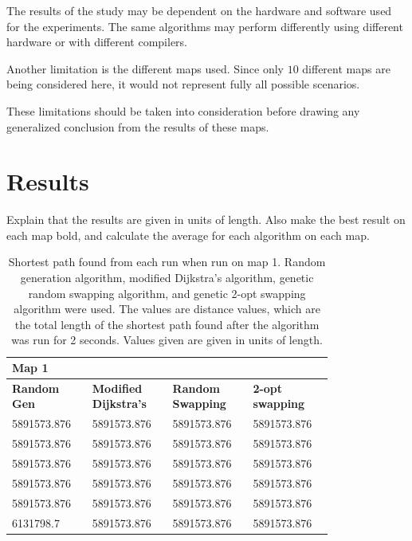\documentclass{article}
\begin{document}
\noindent
The results of the study may be dependent on the hardware and software used for the experiments. The same algorithms may perform differently using different hardware or with different compilers.

\noindent
Another limitation is the different maps used. Since only $10$ different maps are being considered here, it would not represent fully all possible scenarios. 

\noindent
These limitations should be taken into consideration before drawing any generalized conclusion from the results of these maps.


\section{Results}\label{Results}

Explain that the results are given in units of length. 
Also make the best result on each map bold, and calculate the average for each algorithm on each map.





\begin{table}[H]
    \caption{Shortest path found from each run when run on map 1. Random generation algorithm, modified Dijkstra's algorithm, genetic random swapping algorithm, and genetic 2-opt swapping algorithm were used. The values are distance values, which are the total length of the shortest path found after the algorithm was run for 2 seconds. Values given are given in units of length.}
    \centering
    \begin{tabular}{|p{0.2\linewidth}|p{0.2\linewidth}|p{0.2\linewidth}|p{0.2\linewidth}|}
    \hline
        \textbf{Map 1} & ~ & ~ & ~ \\ \hline
        \textbf{Random Gen} & \textbf{Modified Dijkstra's} & \textbf{Random Swapping} & \textbf{2-opt swapping} \\ \hline
        5891573.876 & 5891573.876 & 5891573.876 & 5891573.876 \\ \hline
        5891573.876 & 5891573.876 & 5891573.876 & 5891573.876 \\ \hline
        5891573.876 & 5891573.876 & 5891573.876 & 5891573.876 \\ \hline
        5891573.876 & 5891573.876 & 5891573.876 & 5891573.876 \\ \hline
        5891573.876 & 5891573.876 & 5891573.876 & 5891573.876 \\ \hline
        6131798.7 & 5891573.876 & 5891573.876 & 5891573.876 \\ \hline
    \end{tabular}
\end{table}
\end{document}
